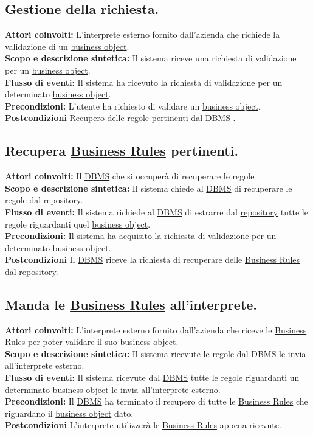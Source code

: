 \subsection{Gestione della richiesta.}
\textbf{Attori coinvolti:} L'interprete esterno fornito dall'azienda che richiede la validazione di un \underline{business object}.\\
\textbf{Scopo e descrizione sintetica:} Il sistema riceve una richiesta di validazione per un \underline{business object}.\\
\textbf{Flusso di eventi:} Il sistema ha ricevuto la richiesta di validazione per un determinato \underline{business object}.\\
\textbf{Precondizioni:} L'utente ha richiesto di validare un \underline{business object}.\\
\textbf{Postcondizioni} Recupero delle regole pertinenti dal \underline{DBMS} .

\subsection{Recupera \underline{Business Rules} pertinenti.}
\textbf{Attori coinvolti:} Il \underline{DBMS} che si occuper\`a di recuperare le regole\\
\textbf{Scopo e descrizione sintetica:} Il sistema chiede al \underline{DBMS} di recuperare le regole dal \underline{repository}.\\
\textbf{Flusso di eventi:} Il sistema richiede al \underline{DBMS} di estrarre dal \underline{repository} tutte le regole riguardanti quel \underline{business object}.\\
\textbf{Precondizioni:} Il sistema ha acquisito la richiesta di validazione per un determinato \underline{business object}.\\
\textbf{Postcondizioni} Il \underline{DBMS} riceve la richiesta di recuperare delle \underline{Business Rules} dal \underline{repository}.
\subsection{Manda le \underline{Business Rules} all'interprete.}
\textbf{Attori coinvolti:} L'interprete esterno fornito dall'azienda che riceve le \underline{Business Rules} per poter validare il suo \underline{business object}.\\
\textbf{Scopo e descrizione sintetica:} Il sistema ricevute le regole dal \underline{DBMS} le invia all'interprete esterno.\\
\textbf{Flusso di eventi:} Il sistema ricevute dal \underline{DBMS} tutte le regole riguardanti un determinato \underline{business object} le invia all'interprete esterno.\\
\textbf{Precondizioni:} Il \underline{DBMS} ha terminato il recupero di tutte le \underline{Business Rules} che riguardano il \underline{business object} dato.\\
\textbf{Postcondizioni} L'interprete utilizzer\`a le \underline{Business Rules} appena ricevute.


